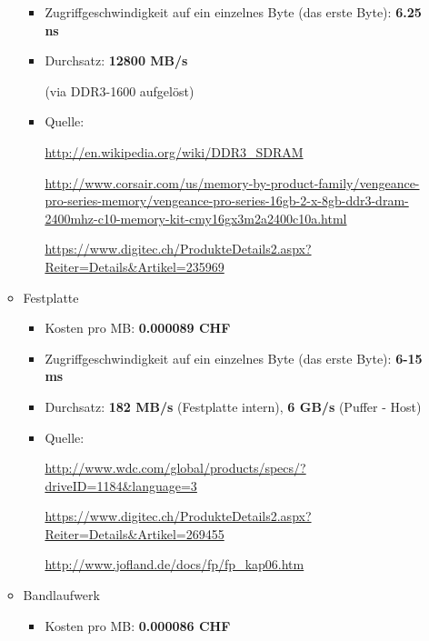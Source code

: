 \documentclass[10pt]{article}
\begin{document}
\begin{enumerate}[label=\alph*)]
\begin{itemize}
\begin{itemize}
						\item Zugriffgeschwindigkeit auf ein einzelnes Byte (das erste Byte): \textbf{6.25 ns}
						
						\item Durchsatz: \textbf{12800 MB/s}
						
						(via DDR3-1600 aufgelöst)
						
						\item Quelle:
						
							\url{http://en.wikipedia.org/wiki/DDR3_SDRAM}
							
							\url{http://www.corsair.com/us/memory-by-product-family/vengeance-pro-series-memory/vengeance-pro-series-16gb-2-x-8gb-ddr3-dram-2400mhz-c10-memory-kit-cmy16gx3m2a2400c10a.html}
							
							\url{https://www.digitec.ch/ProdukteDetails2.aspx?Reiter=Details&Artikel=235969}
					\end{itemize}

				\item Festplatte
					\begin{itemize}
						\item Kosten pro MB:\textbf{ 0.000089 CHF}
						
						\item Zugriffgeschwindigkeit auf ein einzelnes Byte (das erste Byte): \textbf{6-15 ms}
						
						\item Durchsatz: \textbf{182 MB/s} (Festplatte intern), \textbf{6 GB/s} (Puffer - Host)
						
						\item Quelle:
						
							\url{http://www.wdc.com/global/products/specs/?driveID=1184&language=3}
							
							\url{https://www.digitec.ch/ProdukteDetails2.aspx?Reiter=Details&Artikel=269455}
							
							\url{http://www.jofland.de/docs/fp/fp_kap06.htm}
					\end{itemize}
					
				\item Bandlaufwerk
					\begin{itemize}
						\item Kosten pro MB: \textbf{0.000086 CHF}
						

\end{itemize}
\end{itemize}
\end{enumerate}
\end{document}
